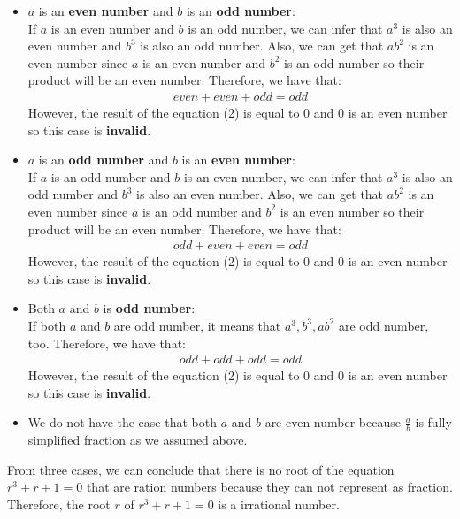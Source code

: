 \documentclass{article}
\begin{document}
\begin{itemize}
    \item $a$ is an \textbf{even number} and $b$ is an \textbf{odd number}:\\

          If $a$ is an even number and $b$ is an odd number,  we can infer that $a^3$ is also an even number and $b^3$ is also an odd number. Also, we can get that $ab^2$ is an even number since $a$ is an even number and $b^2$ is an odd number so their product will be an even number. Therefore, we have that:
          \begin{align*}
              even + even + odd = odd
          \end{align*}
          However, the result of the equation (2) is equal to 0 and 0 is an even number so this case is \textbf{invalid}.
    \item $a$ is an \textbf{odd number} and $b$ is an \textbf{even number}:\\

          If $a$ is an odd number and $b$ is an even number,  we can infer that $a^3$ is also an odd number and $b^3$ is also an even number. Also, we can get that $ab^2$ is an even number since $a$ is an odd number and $b^2$ is an even number so their product will be an even number. Therefore, we have that:
          \begin{align*}
              odd + even + even = odd
          \end{align*}
          However, the result of the equation (2) is equal to 0 and 0 is an even number so this case is \textbf{invalid}.
    \item Both $a$ and $b$ is \textbf{odd number}:\\

          If both $a$ and $b$ are odd number, it means that $a^3, b^3, ab^2$ are odd number, too. Therefore, we have that:
          \begin{align*}
              odd + odd + odd = odd
          \end{align*}
          However, the result of the equation (2) is equal to 0 and 0 is an even number so this case is \textbf{invalid}.
    \item We do not have the case that both $a$ and $b$ are even number because $\frac{a}{b}$ is fully simplified fraction as we assumed above.
\end{itemize}
From three cases, we can conclude that there is no root of the equation $r^3 + r + 1 = 0$ that are ration numbers because they can not represent as fraction. Therefore, the root $r$ of $r^3 + r + 1 = 0$ is a irrational number.
\end{document}
